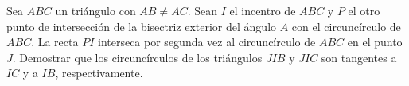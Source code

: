 Sea $ABC$ un triángulo con $AB \neq AC$. Sean $I$ el incentro de $ABC$ y $P$ el otro punto de intersección de la bisectriz exterior del ángulo $A$ con el circuncírculo de $ABC$. La recta $PI$ interseca por segunda vez al circuncírculo de $ABC$ en el punto $J$. Demostrar que los circuncírculos de los triángulos $JIB$ y $JIC$ son tangentes a $IC$ y a $IB$, respectivamente.
